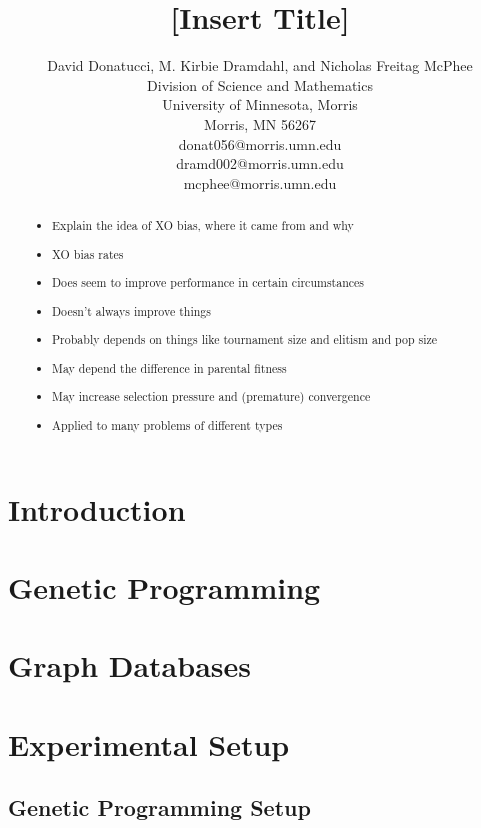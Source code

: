 \documentclass[12pt]{article}
\title{[Insert Title]}
\author{
 		David Donatucci, M. Kirbie Dramdahl, and Nicholas Freitag McPhee\\
        Division of Science and Mathematics\\
        University of Minnesota, Morris\\
        Morris, MN 56267\\
        donat056@morris.umn.edu\\
        dramd002@morris.umn.edu\\
        mcphee@morris.umn.edu\\
}
\date{}
\begin{document}
\pagestyle{plain}

\maketitle

\begin{abstract}

\begin{itemize}
	\item Explain the idea of XO bias, where it came from and why
	\item XO bias rates
	\item Does seem to improve performance in certain circumstances
	\item Doesn't always improve things
	\item Probably depends on things like tournament size and elitism and pop size
		\item May depend the difference in parental fitness
	\item May increase selection pressure and (premature) convergence
	\item Applied to many problems of different types
\end{itemize}

\end{abstract}

\section{Introduction} \label{Introduction}

\section{Genetic Programming} \label{Genetic Programming}

\section{Graph Databases} \label{Graph Databases}

\section{Experimental Setup} \label{Experiments}

\subsection{Genetic Programming Setup} \label{Genetic Programming Setup}
\end{document}
